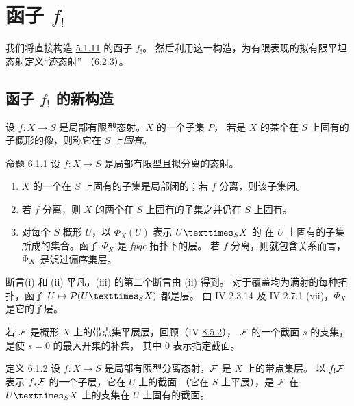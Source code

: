 \section[函子 $f_{!}$]{函子 $f_{!}$}\pageoriginale

我们将直接构造 \hyperref[XVII.var5.1.11]{5.1.11} 的函子 $f_{!}$。
然后利用这一构造，为有限表现的拟有限平坦态射定义“迹态射”
（\hyperref[XVII.thm6.2.3]{6.2.3}）。

\subsection[函子 $f_{!}$ 的新构造]{函子 $f_{!}$ 的新构造}

设 $f:X\rightarrow S$ 是局部有限型态射。$X$ 的一个子集 $P$，
若是 $X$ 的某个在 $S$ 上固有的子概形的像，则称它在 $S$ 上\emph{固有}。

\begin{enonce*}{命题 6.1.1}
设 $f:X\rightarrow S$ 是局部有限型且拟分离的态射。
\begin{enumerate}
\renewcommand{\theenumi}{\roman{enumi}}
\renewcommand{\labelenumi}{(\theenumi)}
\item $X$ 的一个在 $S$ 上固有的子集是局部闭的；若 $f$ 分离，则该子集闭。

\item 若 $f$ 分离，则 $X$ 的两个在 $S$ 上固有的子集之并仍在 $S$ 上固有。

\item 对每个 $S$-概形 $U$，以 $\Phi_{X}(U)$ 表示 $\fprod{U}{X}{S}$ 的
在 $U$ 上固有的子集所成的集合。函子 $\Phi_{X}$ 是 \emph{fpqc} 拓扑下的层。
若 $f$ 分离，则就包含关系而言，$\Phi_X$ 是滤过偏序集层。
\end{enumerate}
\end{enonce*}

断言\pageoriginale (i) 和 (ii) 平凡，(iii) 的第二个断言由 (ii) 得到。
对于覆盖均为满射的每种拓扑，函子 $U\mapsto \mathcal{P}(\fprod{U}{X}{S})$ 都是层。
由 \EGA IV 2.3.14 及 \EGA IV 2.7.1 (vii)，$\Phi_{X}$ 是它的子层。

若 ${\mathcal F} $ 是概形 $X$ 上的带点集平展层，回顾（IV \hyperref[IV.subsubsec8.5.2]{8.5.2}），
${\mathcal F} $ 的一个截面 $s$ 的支集，是使 $s=0$ 的最大开集的补集，
其中 $0$ 表示指定截面。

\begin{enonce*}{定义 6.1.2}
设 $f:X\rightarrow S$ 是局部有限型分离态射，${\mathcal F} $ 是 $X$ 上的带点集层。
以 $f_{!}{\mathcal F} $ 表示 $f_{\ast}{\mathcal F} $ 的一个子层，它在 $U$ 上的截面
（它在 $S$ 上平展），是 ${\mathcal F} $ 在 $\fprod{U}{X}{S}$ 上的支集在 $U$ 上固有的截面。
\end{enonce*}

